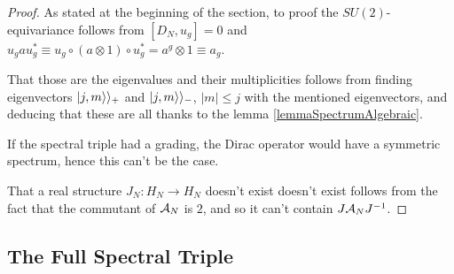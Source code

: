 \begin{proof}
As stated at the beginning of the section, to proof the $SU(2)$-equivariance follows from $[D_N, u_g] = 0$ and $u_g  a  u_g^* \equiv u_g \circ (a \otimes 1) \circ u_g^* = a^g \otimes 1 \equiv a_g$.

That those are the eigenvalues and their multiplicities follows from finding eigenvectors $|j, m \rangle\rangle_+$ and $|j, m\rangle\rangle_-$, $|m| \leq j$ with the mentioned eigenvectors, and deducing that these are all thanks to the lemma \ref{lemmaSpectrumAlgebraic}.

If the spectral triple had a grading, the Dirac operator would have a symmetric spectrum, hence this can't be the case.

That a real structure $J_N: H_N \to H_N$ doesn't exist doesn't exist follows from the fact that the commutant of $\mathcal A_N$ is $2$, and so it can't contain $J \mathcal A_N J^{-1}$.

\end{proof}


\subsection{The Full Spectral Triple}




    
    
